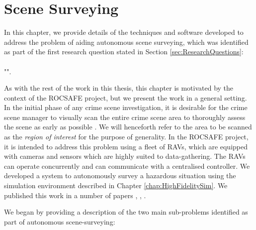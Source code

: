 \chapter{Scene Surveying}\label{chapter:SceneSurveying}
In this chapter, we provide details of the techniques and software developed to address the problem of aiding autonomous scene surveying, which was identified as part of the first research question stated in Section \ref{sec:ResearchQuestions}: 
\\
\\
"\textit{}".
\\
\par As with the rest of the work in this thesis, this chapter is motivated by the context of the ROCSAFE project, but we present the work in a general setting. In the initial phase of any crime scene investigation, it is desirable for the crime scene manager to visually scan the entire crime scene area to thoroughly assess the scene as early as possible \cite{TechnicalWorkingGrouponCrimeSceneInvestigation2013CrimeEnforcement}. We will henceforth refer to the area to be scanned as the \textit{region of interest} for the purpose of generality. In the ROCSAFE project, it is intended to address this problem using a fleet of RAVs, which are equipped with cameras and sensors which are highly suited to data-gathering. The RAVs can operate concurrently and can communicate with a centralised controller. We developed a system to autonomously survey a hazardous situation using the simulation environment described in Chapter \ref{chap:HighFidelitySim}. We published this work in a number of papers \cite{Smyth2018AInvestigation}, \cite{Smyth2018ASupport}, \cite{Smyth2018UsingDrones}.
\par We began by providing a description of the two main sub-problems identified as part of autonomous scene-surveying:
